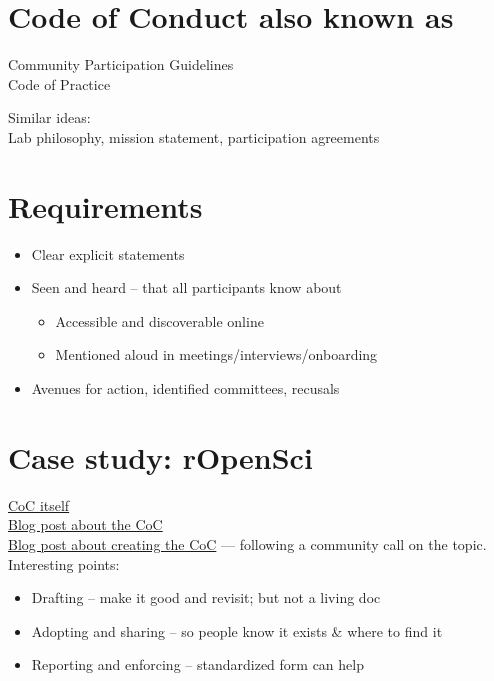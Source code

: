 \documentclass[
  letterpaper,
  DIV=11,
  numbers=noendperiod]{scrreprt}
\providecommand{\tightlist}{%
  \setlength{\itemsep}{0pt}\setlength{\parskip}{0pt}}
\begin{document}
\hypertarget{code-of-conduct-also-known-as}{%
\section{Code of Conduct also known
as}\label{code-of-conduct-also-known-as}}

Community Participation Guidelines\\
Code of Practice

Similar ideas:\\
Lab philosophy, mission statement, participation agreements

\hypertarget{requirements}{%
\section{Requirements}\label{requirements}}

\begin{itemize}
\tightlist
\item
  Clear explicit statements
\item
  Seen and heard -- that all participants know about

  \begin{itemize}
  \tightlist
  \item
    Accessible and discoverable online
  \item
    Mentioned aloud in meetings/interviews/onboarding
  \end{itemize}
\item
  Avenues for action, identified committees, recusals
\end{itemize}

\hypertarget{case-study-ropensci}{%
\section{Case study: rOpenSci}\label{case-study-ropensci}}

\href{https://ropensci.org/code-of-conduct/}{CoC itself}\\
\href{https://ropensci.org/blog/2019/01/14/conduct/}{Blog post about the
CoC}\\
\href{https://ropensci.org/blog/2016/12/21/commcallv12-review-coc/}{Blog
post about creating the CoC} --- following a community call on the
topic. Interesting points:

\begin{itemize}
\tightlist
\item
  Drafting -- make it good and revisit; but not a living doc
\item
  Adopting and sharing -- so people know it exists \& where to find it
\item
  Reporting and enforcing -- standardized form can help
\end{itemize}
\end{document}
